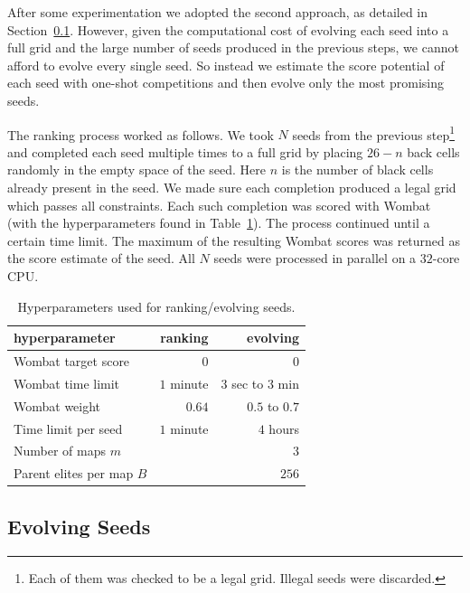 After some experimentation we adopted the second approach, as detailed in Section~\ref{sec:evolution}. However, given the computational cost of evolving each seed into a full grid and the large number of seeds produced in the previous steps, we cannot afford to evolve every single seed. So instead we estimate the score potential of each seed with one-shot competitions and then evolve only the most promising seeds.

The ranking process worked as follows. We took $N$ seeds from the previous step\footnote{Each of them was checked to be a legal grid. Illegal seeds were discarded.} and completed each seed multiple times to a full grid by placing $26-n$ back cells randomly in the empty space of the seed. Here $n$ is the number of black cells already present in the seed. We made sure each completion produced a legal grid which passes all constraints. Each such completion was scored with {\sc Wombat} (with the hyperparameters found in Table~\ref{tab:hyperparameters}). The process continued until a certain time limit. The maximum of the resulting {\sc Wombat} scores was returned as the score estimate of the seed. All $N$ seeds were processed in parallel on a $32$-core CPU.

\begin{table}[t]
\centering
\begin{tabular}{l|r|r}
\toprule
{\bf hyperparameter} & {\bf ranking} & {\bf evolving} \\
\midrule
{\sc Wombat} target score & $0$ & $0$ \\
{\sc Wombat} time limit & $1$ minute & $3$ sec to $3$ min \\
{\sc Wombat} weight & $0.64$ & $0.5$ to $0.7$ \\
Time limit per seed & $1$ minute & $4$ hours \\
Number of maps $m$ & & $3$ \\
Parent elites per map $B$ & & $256$ \\
\bottomrule
\end{tabular}
\caption{Hyperparameters used for ranking/evolving seeds.}
\label{tab:hyperparameters}
\end{table}


\subsection{Evolving Seeds}
\label{sec:evolution}

